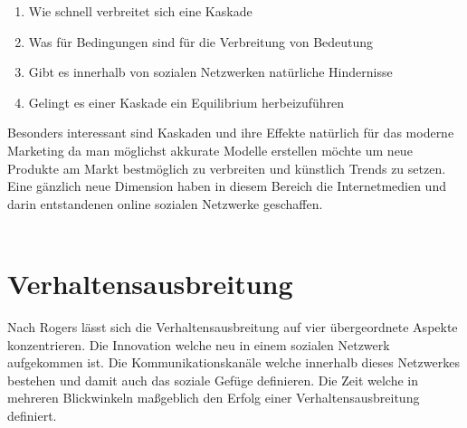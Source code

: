 \documentclass[12pt]{article}
\begin{document}
\begin{enumerate}
\item Wie schnell verbreitet sich eine Kaskade
\item Was für Bedingungen sind für die Verbreitung von Bedeutung
\item Gibt es innerhalb von sozialen Netzwerken natürliche Hindernisse
\item Gelingt es einer Kaskade ein Equilibrium herbeizuführen
\end{enumerate}
Besonders interessant sind Kaskaden und ihre Effekte natürlich für das moderne Marketing da man möglichst akkurate Modelle erstellen möchte um neue Produkte am Markt bestmöglich zu verbreiten und künstlich Trends zu setzen. Eine gänzlich neue Dimension haben in diesem Bereich die Internetmedien und darin entstandenen online sozialen Netzwerke geschaffen.\\\\



\section{Verhaltensausbreitung}
Nach Rogers lässt sich die Verhaltensausbreitung auf vier übergeordnete Aspekte konzentrieren. Die Innovation welche neu in  einem sozialen Netzwerk aufgekommen ist. Die Kommunikationskanäle welche innerhalb dieses Netzwerkes bestehen und damit auch das soziale Gefüge definieren. Die Zeit welche in mehreren Blickwinkeln maßgeblich den Erfolg einer Verhaltensausbreitung definiert.
\end{document}
